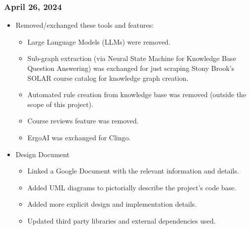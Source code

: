 \documentclass[12pt]{article}
\begin{document}
    \subsubsection{April 26, 2024}

    \begin{itemize}
        \item Removed/exchanged these tools and features:
        \begin{itemize}
            \item Large Language Models (LLMs) were removed.
            \item Sub-graph extraction (via Neural State Machine for Knowledge Base Question Answering) was exchanged for just scraping Stony Brook's SOLAR course catalog for knowledge graph creation.
            \item Automated rule creation from knowledge base was removed (outside the scope of this project).
            \item Course reviews feature was removed.
            \item ErgoAI was exchanged for Clingo.
        \end{itemize}
        \item Design Document
        \begin{itemize}
            \item Linked a Google Document with the relevant information and details.
            \item Added UML diagrams to pictorially describe the project's code base.
            \item Added more explicit design and implementation details.
            \item Updated third party libraries and external dependencies used.
        \end{itemize}
    \end{itemize}
\end{document}
